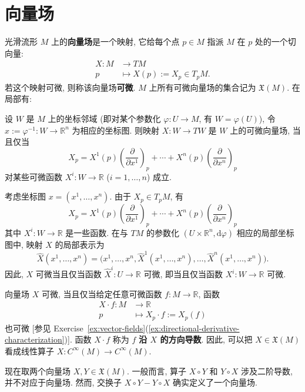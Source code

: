 \section{向量场}\label{sec:vector-fields}

光滑流形 $M$ 上的\textbf{向量场}是一个映射, 它给每个点 $p\in M$ 指派 $M$ 在 $p$ 处的一个切向量:
\begin{align*}
  X:M&\to TM\\
  p&\mapsto X(p):=X_p\in T_pM.
\end{align*}
若这个映射可微, 则称该向量场\textbf{可微}. $M$ 上所有可微向量场的集合记为 $\mathfrak{X}(M)$. 在局部有:

\begin{RiemannProposition}\label{prop:local-components-of-vector-field}
设 $W$ 是 $M$ 上的坐标邻域 (即对某个参数化 $\varphi:U\to M$, 有 $W=\varphi(U)$), 令 $x:=\varphi^{-1}:W\to\mathbb{R}^n$ 为相应的坐标图. 则映射 $X:W\to TW$ 是 $W$ 上的可微向量场, 当且仅当
\[
  X_p=X^1(p)\left(\frac{\partial}{\partial x^1}\right)_p+
    \cdots+X^n(p)\left(\frac{\partial}{\partial x^n}\right)_p
\]
对某些可微函数 $X^i:W\to\mathbb{R}$ ($i=1,\ldots,n$) 成立.
\end{RiemannProposition}

\begin{RiemannProof}
考虑坐标图 $x=(x^1,\ldots,x^n)$. 由于 $X_p\in T_pM$, 有
\[
  X_p=X^1(p)\left(\frac{\partial}{\partial x^1}\right)_p+
    \cdots+X^n(p)\left(\frac{\partial}{\partial x^n}\right)_p
\]
其中 $X^i:W\to\mathbb{R}$ 是一些函数. 在与 $TM$ 的参数化 $(U\times\mathbb{R}^n,\mathrm{d}\varphi)$ 相应的局部坐标图中, 映射 $X$ 的局部表示为
\[
  \widehat X(x^1,\ldots,x^n)
  =\bigl(x^1,\ldots,x^n,\widehat X^1(x^1,\ldots,x^n),
    \ldots,\widehat X^n(x^1,\ldots,x^n)\bigr).
\]
因此, $X$ 可微当且仅当函数 $\widehat X^i:U\to\mathbb{R}$ 可微, 即当且仅当函数 $X^i:W\to\mathbb{R}$ 可微.
\end{RiemannProof}

向量场 $X$ 可微, 当且仅当给定任意可微函数 $f:M\to\mathbb{R}$, 函数
\begin{align*}
  X\cdot f:M&\to\mathbb{R}\\
  p&\mapsto X_p\cdot f:=X_p(f)
\end{align*}
也可微 [参见 Exercise~\ref{ex:vector-fields}(\ref{ex:directional-derivative-characterization})]. 函数 $X\cdot f$ 称为 $f$ \textbf{沿 $X$ 的方向导数}. 因此, 可以把 $X\in\mathfrak{X}(M)$ 看成线性算子 $X:C^\infty(M)\to C^\infty(M)$.

现在取两个向量场 $X,Y\in\mathfrak{X}(M)$. 一般而言, 算子 $X\circ Y$ 和 $Y\circ X$ 涉及二阶导数, 并不对应于向量场. 然而, 交换子 $X\circ Y-Y\circ X$ 确实定义了一个向量场.

